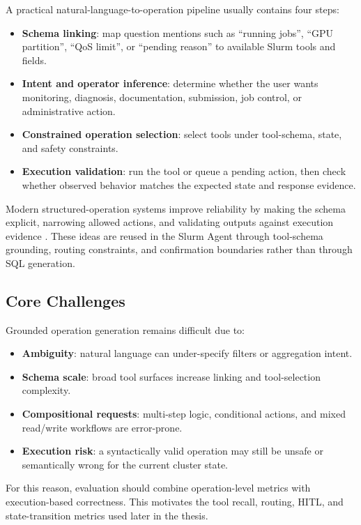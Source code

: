A practical natural-language-to-operation pipeline usually contains four steps:

\begin{itemize}
    \item \textbf{Schema linking}: map question mentions such as ``running jobs'', ``GPU partition'', ``QoS limit'', or ``pending reason'' to available Slurm tools and fields.
    \item \textbf{Intent and operator inference}: determine whether the user wants monitoring, diagnosis, documentation, submission, job control, or administrative action.
    \item \textbf{Constrained operation selection}: select tools under tool-schema, state, and safety constraints.
    \item \textbf{Execution validation}: run the tool or queue a pending action, then check whether observed behavior matches the expected state and response evidence.
\end{itemize}

Modern structured-operation systems improve reliability by making the schema explicit, narrowing allowed actions, and validating outputs against execution evidence \cite{wang2020ratsql}. These ideas are reused in the Slurm Agent through tool-schema grounding, routing constraints, and confirmation boundaries rather than through SQL generation.



\subsection{Core Challenges}

Grounded operation generation remains difficult due to:

\begin{itemize}
    \item \textbf{Ambiguity}: natural language can under-specify filters or aggregation intent.
    \item \textbf{Schema scale}: broad tool surfaces increase linking and tool-selection complexity.
    \item \textbf{Compositional requests}: multi-step logic, conditional actions, and mixed read/write workflows are error-prone.
    \item \textbf{Execution risk}: a syntactically valid operation may still be unsafe or semantically wrong for the current cluster state.
\end{itemize}

For this reason, evaluation should combine operation-level metrics with execution-based correctness. This motivates the tool recall, routing, HITL, and state-transition metrics used later in the thesis.